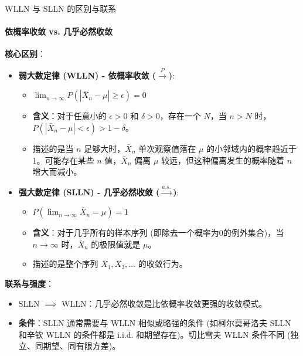 \documentclass[UTF8]{beamer} %
\begin{document}
\begin{frame}[shrink=5]{WLLN 与 SLLN 的区别与联系}
    \framesubtitle{依概率收敛 vs. 几乎必然收敛}
    \textbf{核心区别}：
    \begin{itemize}
        \item \textbf{弱大数定律 (WLLN) - \alert{依概率收敛} ($\xrightarrow{P}$)}:
            \begin{itemize}
                \item $\lim_{n \to \infty} P(|\bar{X}_n - \mu| \geq \epsilon) = 0$
                \item \textbf{含义}：对于任意小的 $\epsilon > 0$ 和 $\delta > 0$，存在一个 $N$，当 $n > N$ 时，$P(|\bar{X}_n - \mu| < \epsilon) > 1 - \delta$。
                \item 描述的是当 $n$ 足够大时，$\bar{X}_n$ \alert{单次观察值}落在 $\mu$ 的小邻域内的\alert{概率}趋近于1。可能存在某些 $n$ 值，$\bar{X}_n$ 偏离 $\mu$ 较远，但这种偏离发生的概率随着 $n$ 增大而减小。
            \end{itemize}
        \item \textbf{强大数定律 (SLLN) - \alert{几乎必然收敛} ($\xrightarrow{a.s.}$)}:
            \begin{itemize}
                \item $P(\lim_{n \to \infty} \bar{X}_n = \mu) = 1$
                \item \textbf{含义}：对于\alert{几乎所有}的样本序列 (即除去一个概率为0的例外集合)，当 $n \to \infty$ 时，$\bar{X}_n$ 的\alert{极限值}就是 $\mu$。
                \item 描述的是\alert{整个序列} $\bar{X}_1, \bar{X}_2, \dots$ 的收敛行为。
            \end{itemize}
    \end{itemize}
    \pause
    \textbf{联系与强度}：
    \begin{itemize}
        \item \alert{SLLN $\implies$ WLLN}：几乎必然收敛是比依概率收敛更强的收敛模式。
        \item \textbf{条件}：SLLN 通常需要与 WLLN 相似或略强的条件 (如柯尔莫哥洛夫 SLLN 和辛钦 WLLN 的条件都是 i.i.d. 和期望存在)。切比雪夫 WLLN 条件不同 (独立、同期望、同有限方差)。
    \end{itemize}
\end{frame}
\end{document}
